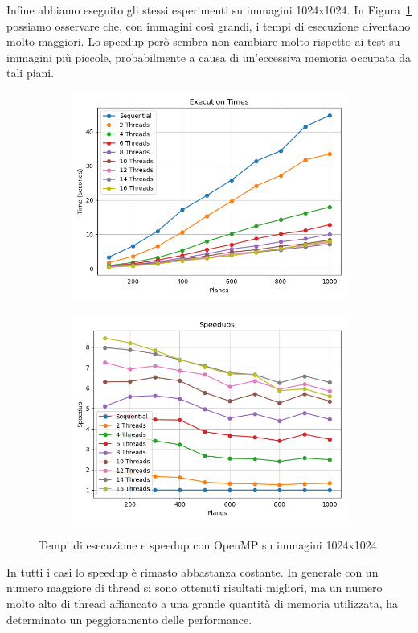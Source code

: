 Infine abbiamo eseguito gli stessi esperimenti su immagini 1024x1024.
In Figura~\ref{fig:omp_1024} possiamo osservare che, con immagini così grandi, i tempi di esecuzione diventano molto maggiori.
Lo speedup però sembra non cambiare molto rispetto ai test su immagini più piccole, probabilmente a causa di un'eccessiva memoria occupata da tali piani.
\begin{figure}[H]
    \centering
    \begin{subfigure}{0.49\textwidth}
        \centering
        \includegraphics[width=\textwidth]{../result_16/plots/1024/results_times}
    \end{subfigure}
    \begin{subfigure}{0.49\textwidth}
        \centering
        \includegraphics[width=\textwidth]{../result_16/plots/1024/results_speedup}
    \end{subfigure}
    \caption{Tempi di esecuzione e speedup con OpenMP su immagini 1024x1024}
    \label{fig:omp_1024}
\end{figure}
In tutti i casi lo speedup è rimasto abbastanza costante.
In generale con un numero maggiore di thread si sono ottenuti risultati migliori, ma un numero molto alto di thread
affiancato a una grande quantità di memoria utilizzata, ha determinato un peggioramento delle performance.

